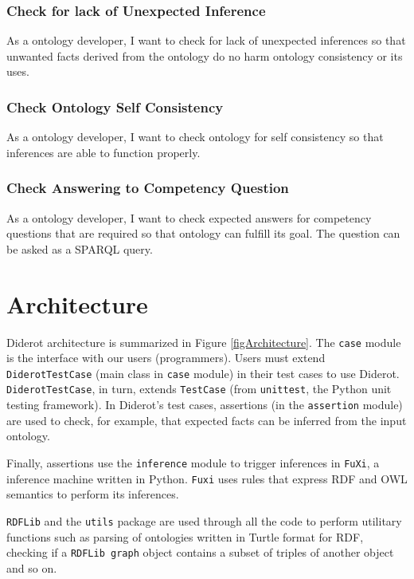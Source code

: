 \documentclass{report}
\begin{document}
\subsubsection{Check for lack of Unexpected Inference}

As a ontology developer, I want to check for lack of unexpected inferences so that unwanted facts
derived from the ontology do no harm ontology consistency or its uses.

\subsubsection{Check Ontology Self Consistency}

As a ontology developer, I want to check ontology for self consistency so that inferences are able to
function properly.

\subsubsection{Check Answering to Competency Question}

As a ontology developer, I want to check expected answers for competency questions that are required
so that ontology can fulfill its goal. The question can be asked as a SPARQL query.

\section{Architecture}

Diderot architecture is summarized in Figure \ref{figArchitecture}.
The \texttt{case} module is the interface with our users (programmers).
Users must extend \texttt{DiderotTestCase} (main class in \texttt{case} module) in their test cases to use Diderot.
\texttt{DiderotTestCase}, in turn, extends \texttt{TestCase} (from \texttt{unittest}, the Python unit testing framework).
In Diderot's test cases, assertions (in the \texttt{assertion} module) are used to check, for example, that expected facts can be inferred from the input ontology.

Finally, assertions use the \texttt{inference} module to trigger inferences in \texttt{FuXi}, a inference machine written in Python.
\texttt{Fuxi} uses rules that express RDF and OWL semantics to perform its inferences.

\texttt{RDFLib} and the \texttt{utils} package are used through all the code to perform utilitary functions such as parsing of ontologies written in Turtle format for RDF, checking if a \texttt{RDFLib graph} object contains a subset of triples of another object and so on.
\end{document}
